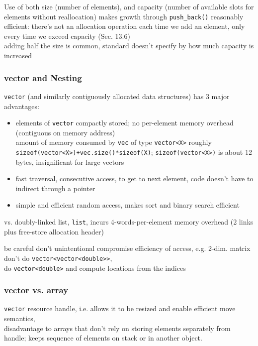 \documentclass[10pt]{amsart}
\begin{document}
Use of both size (number of elements), and capacity (number of available slots for elements without reallocation) makes growth through \verb|push_back()| reasonably efficient: there's not an allocation operation each time we add an element, only every time we exceed capacity (Sec. 13.6) \\
adding half the size is common, standard doesn't specify by how much capacity is increased

\subsubsection{vector and Nesting}

\verb|vector| (and similarly contiguously allocated data structures) has 3 major advantages:
\begin{itemize}
	\item elements of \verb|vector| compactly stored; no per-element memory overhead (contiguous on memory address) \\
	amount of memory consumed by \verb|vec| of type \verb|vector<X>| roughly \\
	\verb|sizeof(vector<X>)+vec.size()*sizeof(X)|; \verb|sizeof(vector<X>)| is about 12 bytes, insignificant for large vectors
	\item fast traversal, consecutive access, to get to next element, code doesn't have to indirect through a pointer 
	\item simple and efficient random access, makes sort and binary search efficient
\end{itemize}

vs. doubly-linked list, \verb|list|, incurs 4-words-per-element memory overhead (2 links plus free-store allocation header)

be careful don't unintentional compromise efficiency of access, e.g. 2-dim. matrix \\
don't do \verb|vector<vector<double>>|, \\
do \verb|vector<double>| and compute locations from the indices 

\subsubsection{vector vs. array}

\verb|vector| resource handle, i.e. allows it to be resized and enable efficient move semantics, \\
disadvantage to arrays that don't rely on storing elements separately from handle; keeps sequence of elements on stack or in another object.
\end{document}
